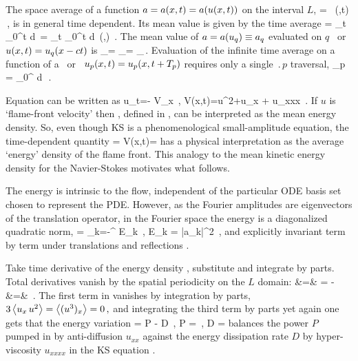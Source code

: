 The {space average} of a function $a = a(x,t) = a(u(x,t))$  on
the interval $L$,
\beq
    \expct{\obser} = \Lint{\pSpace}\, \obser(\pSpace,t)
    \,,
    \label{rpo:spac_ave}
\eeq
is in general time dependent.
Its mean value is given by the {time average}
\beq
\timeAver{\obser}
    =
\lim_{t\rightarrow \infty}  \int_0^t \! d\tau \, \expct{\obser}
    =
\lim_{t\rightarrow \infty}  \int_0^t \!
    \Lint{\tau}  d\pSpace\, \obser(\pSpace,\tau)
    \,.
\label{rpo:tim_ave}
\eeq
The mean value of $a = a(u_q) \equiv a_q$ evaluated on $q$
\eqv\ or {\reqv} $u(x,t) = u_q(x-ct)$ is
\beq
\timeAver{\obser}_\stagn = \expct{\obser}_\stagn = \obser_\stagn\,.
\label{rpo:u-eqv} \eeq Evaluation of the infinite time average
 on a function of a \po\ or \rpo\
$u_p(x,t)=u_p(x,t+{T_{p}})$ requires only a single
$\period{p}$ traversal,
\beq
  \timeAver{\obser}_p = 
    \int_0^{\period{p}} \! d\tau \, \expct{\obser}
\,.
\label{rpo:u-cyc}
\eeq

Equation  can be written as
\beq
    u_t=- V_x
        \,,\qquad
    V(x,t)={\textstyle{}}u^2+u_{x} + u_{xxx}
    \,.
 If $u$ is `flame-front velocity' then \expctE, defined in
\refeq{eq:stdks}, can be interpreted as the mean energy density.
So, even though KS is a phenomenological
small-amplitude equation, the time-dependent quantity
\beq
    \expctE=
  \Lint{\pSpace}
  V(x,t)=
  \Lint{\pSpace} 
  \label{ksEnergy} \eeq
has a physical interpretation as the average `energy'
density of the flame front. This analogy to the mean kinetic energy
density for the Navier-Stokes motivates what follows.

The energy  is intrinsic to
the flow, independent of the particular ODE basis set
chosen to represent the PDE. However, as the Fourier
amplitudes are eigenvectors of the translation operator,
in the Fourier space the energy is a diagonalized
quadratic norm,
\beq
\expctE
          =  \sum_{k=-\infty}^{\infty} E_k
\,,\qquad
E_k =
    {\textstyle{}}|a_k|^2
\,,
and explicitly invariant term by term
under translations
and reflections .

Take time derivative of the energy density ,
substitute  and integrate by parts. Total derivatives vanish
by the spatial periodicity on the $L$ domain:
\bea
   \dot{\expctE} &=&
         = - 
    \continue
    &=&
    \,.
\label{rpo:ksErate}
\eea
The first term in  vanishes by
integration by parts,
\(
3 \left\langle { u_x \, u^2} \right\rangle= \left\langle {(u^3)_x} \right\rangle = 0
\,,
\)
and integrating the third term by parts yet again
one gets that the energy variation
\beq
   \dot{\expctE} = P - D
                \,,\qquad
      P =  
                \,,\quad
      D =  
balances the power $P$ pumped in by anti-diffusion $u_{xx}$
against the energy dissipation rate $D$
by hyper-viscosity $u_{xxxx}$
in the KS equation .

